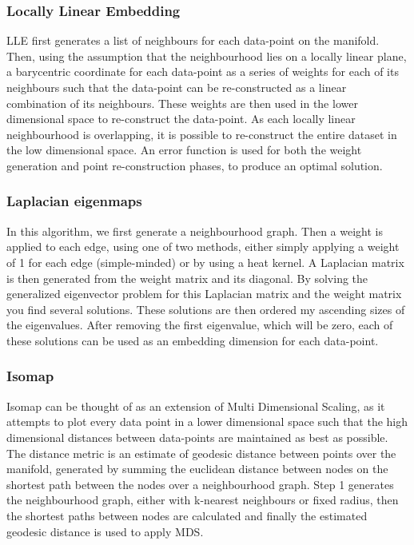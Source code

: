\documentclass{article}
\begin{document}
\subsubsection{Locally Linear Embedding}
LLE first generates a list of neighbours for each data-point on the manifold. Then, using the assumption that the neighbourhood lies on a locally linear plane, a barycentric coordinate for each data-point as a series of weights for each of its neighbours such that the data-point can be re-constructed as a linear combination of its neighbours. These weights are then used in the lower dimensional space to re-construct the data-point. As each locally linear neighbourhood is overlapping, it is possible to re-construct the entire dataset in the low dimensional space. An error function is used for both the weight generation and point re-construction phases, to produce an optimal solution.
\subsubsection{Laplacian eigenmaps}
In this algorithm, we first generate a neighbourhood graph. Then a weight is applied to each edge, using one of two methods, either simply applying a weight of 1 for each edge (simple-minded) or by using a heat kernel. A Laplacian matrix is then generated from the weight matrix and its diagonal. By solving the generalized eigenvector problem for this Laplacian matrix and the weight matrix you find several solutions. These solutions are then ordered my ascending sizes of the eigenvalues. After removing the first eigenvalue, which will be zero, each of these solutions can be used as an embedding dimension for each data-point.
\subsubsection{Isomap}
Isomap can be thought of as an extension of Multi Dimensional Scaling, as it attempts to plot every data point in a lower dimensional space such that the high dimensional distances between data-points are maintained as best as possible. The distance metric is an estimate of geodesic distance between points over the manifold, generated by summing the euclidean distance between nodes on the shortest path between the nodes over a neighbourhood graph. Step 1 generates the neighbourhood graph, either with k-nearest neighbours or fixed radius, then the shortest paths between nodes are calculated and finally the estimated geodesic distance is used to apply MDS.
\end{document}
